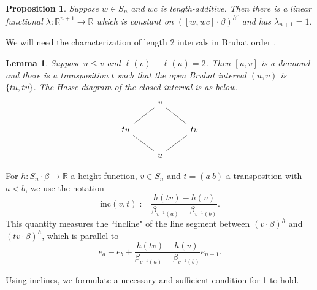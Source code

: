 \documentclass[11pt]{amsart}
\newtheorem{lemma}[Thm]{Lemma}
\newtheorem{proposition}[Thm]{Proposition}
\theoremstyle{definition}
\newcommand{\RR}{\mathbb{R}}
\def\lin{\lambda}
\def\hgt{h}
\def\hc{\hgt^c}
\def\pt{\beta}
\def\steep{{\mathrm {inc}}}
\begin{document}
\begin{proposition}\label{prop:good-bip-lifted-to-plane}
	Suppose $w\in S_n$ and $wc$ is length-additive. Then there is a linear functional $\lin: \RR^{n+1} \to \RR$ which is constant on $([w,wc] \cdot \pt)^{\hc}$ and has $\lin_{n+1}=1$.
\end{proposition}

We will need the characterization of length 2 intervals in Bruhat order \cite{BGG73}.

\begin{lemma}\label{lem:bruhat-length-2-facts}
  Suppose $u \leq v$ and $\ell(v)-\ell(u) =2$. Then $[u,v]$ is a
  diamond and there is a transposition $t$ such that the open Bruhat
  interval $(u,v)$ is $\{tu, tv\}$. The Hasse diagram of the closed
  interval is as below.
		\[\begin{tikzcd}
		& {v} \\
		{tu} && {tv} \\
		& u
		\arrow[no head, from=1-2, to=2-3]
		\arrow[no head, from=2-1, to=1-2]
		\arrow[no head, from=2-3, to=3-2]
		\arrow[no head, from=3-2, to=2-1]
	\end{tikzcd}\]
\end{lemma}


For $\hgt:S_n \cdot \pt \to \RR$ a height function, $v \in S_n$ and $t=(a~b)$ a transposition with $a<b$, we use the notation
\begin{equation}\label{eq:incline}
	\steep(v, t):=\frac{\hgt(t v)-\hgt(v)}{\pt_{v^{-1}(a)}-\pt_{v^{-1}(b)}}.
\end{equation}
This quantity measures the ``incline" of the line segment between $(v \cdot \pt)^\hgt$ and $(tv \cdot \pt)^\hgt$, which is parallel to 
\[e_a -e_b + \frac{\hgt(t v)-\hgt(v)}{\pt_{v^{-1}(a)}-\pt_{v^{-1}(b)}}  e_{n+1}.\]

Using inclines, we formulate a necessary and sufficient condition for \cref{prop:good-bip-lifted-to-plane} to hold.
\end{document}
